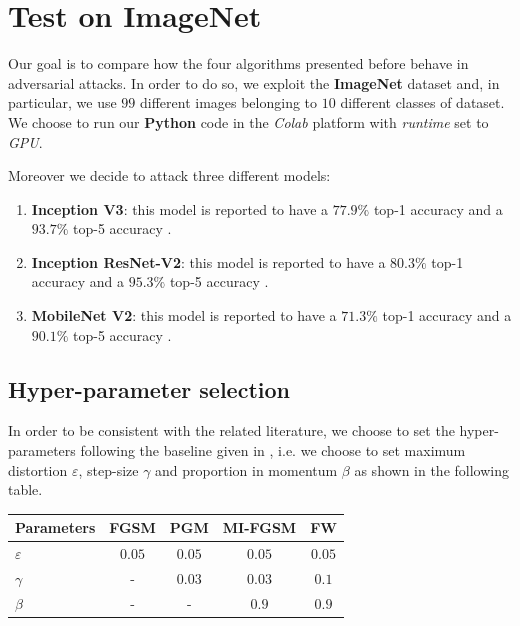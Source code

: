 \documentclass[10pt,twocolumn,letterpaper, english]{article}
\theoremstyle{definition}
\theoremstyle{plain}
\theoremstyle{plain}
\theoremstyle{plain}
\theoremstyle{plain}
\theoremstyle{remark}
\theoremstyle{remark}
\theoremstyle{definition}
\theoremstyle{definition}
\theoremstyle{definition}
\theoremstyle{definition}
\renewcommand{\epsilon}{\varepsilon}
\begin{document}
\section{Test on ImageNet}

Our goal is to compare how the four algorithms presented before behave in adversarial attacks. 
In order to do so, we exploit the \textbf{ImageNet} dataset and, in particular, we use $99$ different images belonging to $10$ different classes of dataset. 
We choose to run our \textbf{Python} code in the \textit{Colab} platform with \textit{runtime} set to \textit{GPU}.

Moreover we decide to attack three different models: 
\begin{enumerate}
    \item \textbf{Inception V3}: this model is reported to have a $77.9\%$ top-1 accuracy and a $93.7\%$ top-5 accuracy \cite{keras}.
    \item \textbf{Inception ResNet-V2}: this model is reported to have a $80.3\%$ top-1 accuracy and a	$95.3\%$ top-5 accuracy \cite{keras}.
    \item \textbf{MobileNet V2}: this model is reported to have a $71.3\%$ top-1 accuracy and a	$90.1\%$ top-5 accuracy \cite{keras}.
    
\end{enumerate}


\subsection{Hyper-parameter selection}

In order to be consistent with the related literature, we choose to set the hyper-parameters following the baseline given in \cite{frank}, i.e. we choose to set maximum distortion $\epsilon$, step-size $\gamma$ and proportion in momentum $\beta$ as shown in the following table. 


\begin{center}
    \begin{tabular}{l|c|c|c|c}
    \hline
     Parameters & FGSM & PGM & MI-FGSM & FW \\
     \hline
     $\epsilon$ & $0.05$ & $0.05$ & $0.05$ & $0.05$  \\
     
     $\gamma$ & - & $0.03$ & $0.03$ & $0.1$ \\
     
     $\beta$ & - & - & $0.9$ & $0.9$  \\
    \hline
   \end{tabular}
\end{center}
\end{document}
